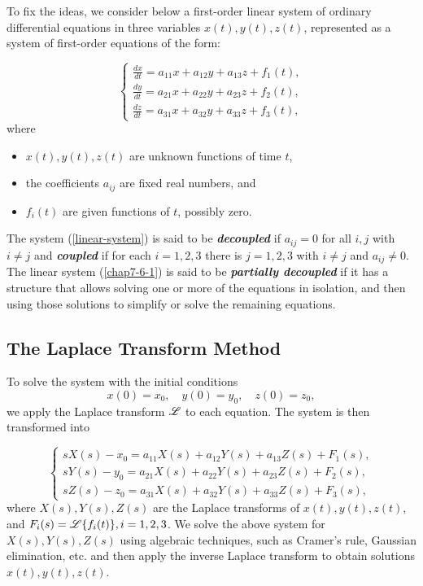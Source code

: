  To fix the ideas, we consider below a first-order linear system of ordinary differential equations in three variables $x(t), y(t), z(t)$, represented as a system of first-order equations of the form:

 \begin{equation}\label{linear-system}
 \begin{cases}
	 \displaystyle \frac{dx}{dt} = a_{11}x + a_{12}y + a_{13}z + f_1(t), \\[6pt]
	 \displaystyle \frac{dy}{dt} = a_{21}x + a_{22}y + a_{23}z + f_2(t), \\[6pt]
	 \displaystyle \frac{dz}{dt} = a_{31}x + a_{32}y + a_{33}z + f_3(t), 
	 \end{cases}
 \end{equation}
	where
	\begin{itemize}[noitemsep]
		\item \( x(t), y(t), z(t) \) are  unknown functions of time \( t \),
		\item the coefficients \( a_{ij} \) are fixed real numbers, and
		\item \( f_i(t) \) are given functions of \( t \), possibly zero.
	\end{itemize}
	
	The system (\ref{linear-system}) is said to be \textbf{\textit{decoupled}} if $a_{ij}= 0$ for all $i, j$ with $i\ne j$ and \textbf{\textit{coupled}} if for each $i = 1, 2, 3$ there is $j = 1, 2,3$ with $i\ne j$ and $a_{ij}\ne  0.$ The linear system (\ref{chap7-6-1}) is said to be \textbf{\textit{partially decoupled}} if it has a structure that allows solving one or more of the equations in isolation, and then using those solutions to simplify or solve the remaining equations.
	\subsection*{The Laplace Transform Method}
	
	To solve the system with the initial conditions
	\[
	x(0) = x_0, \quad y(0) = y_0, \quad z(0) = z_0,
	\]
	we apply the Laplace transform \( \mathscr{L} \) to each equation. The system is then transformed into
	
	\[
	\begin{cases}
		sX(s) - x_0 = a_{11}X(s) + a_{12}Y(s) + a_{13}Z(s) + F_1(s), \\
		sY(s) - y_0 = a_{21}X(s) + a_{22}Y(s) + a_{23}Z(s) + F_2(s), \\
		sZ(s) - z_0 = a_{31}X(s) + a_{32}Y(s) + a_{33}Z(s) + F_3(s),
	\end{cases}
	\]
	where \( X(s), Y(s), Z(s) \) are the Laplace transforms of \( x(t), y(t), z(t) \), and \( F_i(s) = \mathscr{L}\{f_i(t)\}, i =1, 2, 3 \). We solve the above system for  \( X(s), Y(s), Z(s) \)  using algebraic techniques, such as Cramer's rule, Gaussian elimination, etc. and then apply the inverse Laplace transform to obtain solutions \( x(t), y(t), z(t) \).
	
